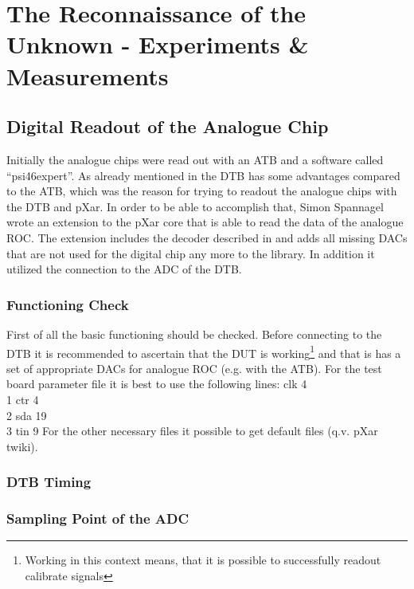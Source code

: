 \documentclass[british,11pt,a4paper]{memoir}
\begin{document}
\chapter{The Reconnaissance of the Unknown - Experiments \& Measurements}
\section{Digital Readout of the Analogue Chip}
Initially the analogue chips were read out with an \ac{ATB} and a software called ``psi46expert''. As already mentioned in  the \ac{DTB} has some advantages compared to the \ac{ATB}, which was the reason for trying to readout the analogue chips with the \ac{DTB} and pXar. In order to be able to accomplish that, Simon Spannagel wrote an extension to the pXar core that is able to read the data of the analogue \ac{ROC}. The extension includes the decoder described in  and adds all missing \ac{DAC}s that are not used for the digital chip any more to the library. In addition it utilized the connection to the \ac{ADC} of the \ac{DTB}.
\subsection{Functioning Check}
First of all the basic functioning should be checked. Before connecting to the \ac{DTB} it is recommended to ascertain that the \ac{DUT} is working\footnote{Working in this context means, that it is possible to successfully readout calibrate signals} and that is has a set of appropriate \ac{DAC}s for analogue \ac{ROC} (e.g. with the \ac{ATB}). For the test board parameter file it is best to use the following lines:\s
{		clk   4\\
	1		ctr   4\\
	2		sda   19\\
	3		tin   9\s}
For the other necessary files it possible to get default files (q.v. pXar twiki).

\subsection{\ac{DTB} Timing}
\subsection{Sampling Point of the \ac{ADC}}
\end{document}
